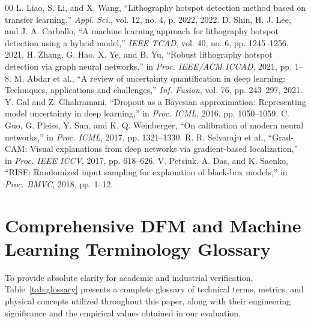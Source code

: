 \documentclass[conference]{IEEEtran}
\begin{document}
\begin{thebibliography}{00}
 L. Liao, S. Li, and X. Wang, ``Lithography hotspot detection method based on transfer learning,'' \textit{Appl. Sci.}, vol. 12, no. 4, p. 2022, 2022.
 D. Shin, H. J. Lee, and J. A. Carballo, ``A machine learning approach for lithography hotspot detection using a hybrid model,'' \textit{IEEE TCAD}, vol. 40, no. 6, pp. 1245--1256, 2021.
 H. Zhang, G. Hao, X. Ye, and B. Yu, ``Robust lithography hotspot detection via graph neural networks,'' in \textit{Proc. IEEE/ACM ICCAD}, 2021, pp. 1--8.
 M. Abdar et al., ``A review of uncertainty quantification in deep learning: Techniques, applications and challenges,'' \textit{Inf. Fusion}, vol. 76, pp. 243--297, 2021.
 Y. Gal and Z. Ghahramani, ``Dropout as a Bayesian approximation: Representing model uncertainty in deep learning,'' in \textit{Proc. ICML}, 2016, pp. 1050--1059.
 C. Guo, G. Pleiss, Y. Sun, and K. Q. Weinberger, ``On calibration of modern neural networks,'' in \textit{Proc. ICML}, 2017, pp. 1321--1330.
 R. R. Selvaraju et al., ``Grad-CAM: Visual explanations from deep networks via gradient-based localization,'' in \textit{Proc. IEEE ICCV}, 2017, pp. 618--626.
 V. Petsiuk, A. Das, and K. Saenko, ``RISE: Randomized input sampling for explanation of black-box models,'' in \textit{Proc. BMVC}, 2018, pp. 1--12.
\end{thebibliography}

\appendices
\section{Comprehensive DFM and Machine Learning Terminology Glossary}
To provide absolute clarity for academic and industrial verification, Table~\ref{tab:glossary} presents a complete glossary of technical terms, metrics, and physical concepts utilized throughout this paper, along with their engineering significance and the empirical values obtained in our evaluation.
\end{document}
